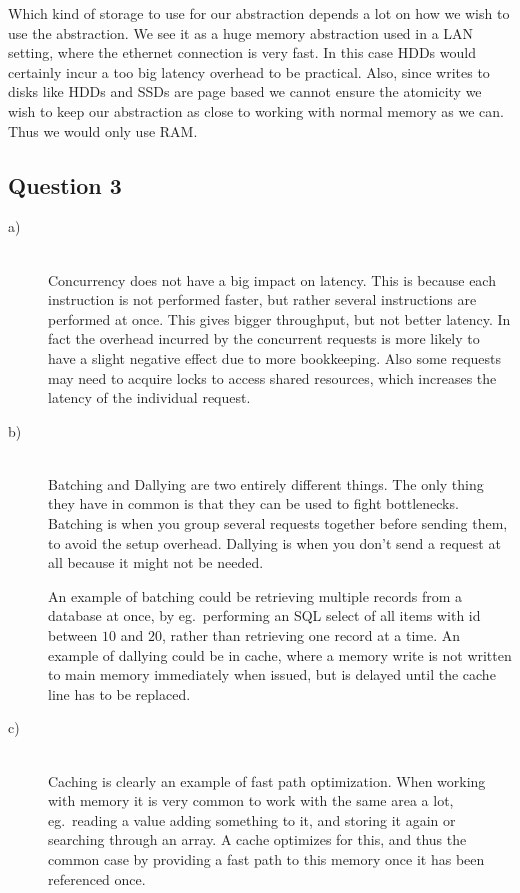 \documentclass[a4paper,final]{article}
\begin{document}
Which kind of storage to use for our abstraction depends a lot on how we wish
to use the abstraction. We see it as a huge memory abstraction used in a LAN
setting, where the ethernet connection is very fast. In this case HDDs would
certainly incur a too big latency overhead to be practical. Also, since writes
to disks like HDDs and SSDs are page based we cannot ensure the atomicity we
wish to keep our abstraction as close to working with normal memory as we can.
Thus we would only use RAM.


\subsection*{Question 3}
\begin{description}
\item [a)]\ \\
Concurrency does not have a big impact on latency. This is because each
instruction is not performed faster, but rather several instructions are
performed at once. This gives bigger throughput, but not better latency. In
fact the overhead incurred by the concurrent requests is more likely to have
a slight negative effect due to more bookkeeping. Also some requests may need
to acquire locks to access shared resources, which increases the latency of
the individual request.

\item [b)]\ \\
Batching and Dallying are two entirely different things. The only thing they
have in common is that they can be used to fight bottlenecks. Batching is when
you group several requests together before sending them, to avoid the setup
overhead. Dallying is when you don't send a request at all because it might
not be needed.

An example of batching could be retrieving multiple records from a database
at once, by eg.~performing an SQL select of all items with id between $10$ and
$20$, rather than retrieving one record at a time.
An example of dallying could be in cache, where a memory write is not written
to main memory immediately when issued, but is delayed until the cache line
has to be replaced.
\item [c)]\ \\
Caching is clearly an example of fast path optimization. When working with
memory it is very common to work with the same area a lot, eg.~reading a value
adding something to it, and storing it again or searching through an array.
A cache optimizes for this, and thus the common case by providing a fast path
to this memory once it has been referenced once.
\end{description}
\end{document}
